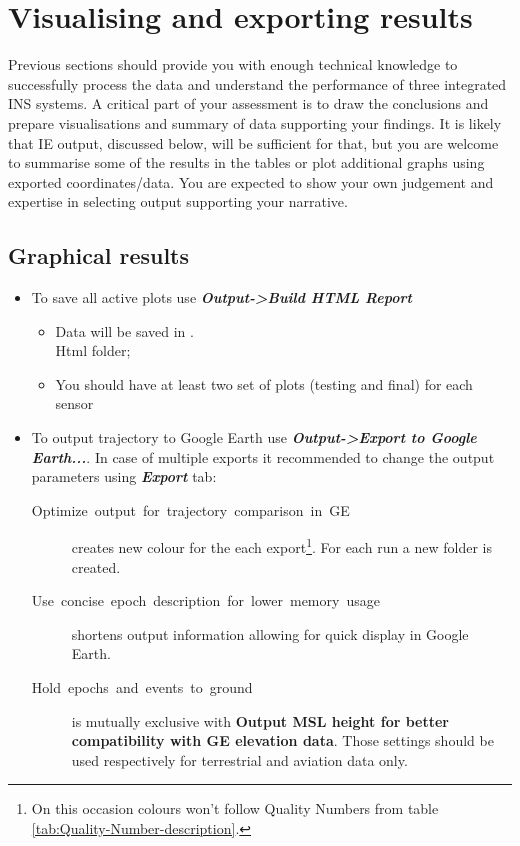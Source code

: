 \documentclass[11pt,fleqn]{book} %
\begin{document}
\chapter{Visualising and exporting  results\label{sec:Exporting-final-results}}

Previous sections should provide you with enough technical knowledge to successfully process the data and understand the performance of three integrated INS systems. A critical part of your assessment is to draw the conclusions and prepare visualisations and summary of data supporting your findings. It is likely that IE output, discussed below, will be sufficient for that, but you are welcome to summarise some of the results in the tables or plot additional graphs using exported coordinates/data. You are expected to show your own judgement and expertise in selecting output supporting your narrative.

\section{Graphical results}

\begin{itemize}
	\item To save all active plots use\textbf{\emph{ Output->Build HTML Report }}
	\begin{itemize}
		\item Data will be saved in .\\Html folder;
		\item You should have at least two set of plots (testing and final) for each sensor
	\end{itemize}
	\item To output trajectory to Google Earth use\textbf{\emph{ Output->Export to Google Earth...}}. In case of multiple exports it recommended to change the output parameters using \textbf{\emph{Export}} tab:
	\begin{description}
		\item [{Optimize~output~for~trajectory~comparison~in~GE}] creates new colour for the each export\footnote{On this occasion colours won't follow Quality Numbers from table \ref{tab:Quality-Number-description}.}. For each run a new folder is created.
		\item [{Use~concise~epoch~description~for~lower~memory~usage}] shortens output information allowing for quick display in Google Earth.
		\item [Hold~epochs~and~events~to~ground] is mutually exclusive with \textbf{Output MSL height for better compatibility with GE elevation data}. Those settings should be used respectively for terrestrial and aviation data only.
	\end{description}
\end{itemize}
\end{document}
